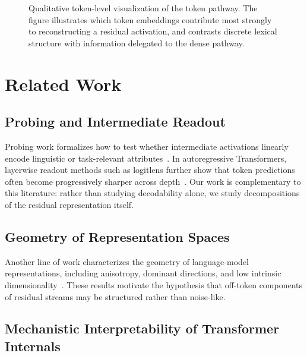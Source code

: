 \documentclass{article}
\begin{document}
\begin{figure}[t]
  \centering
  \caption{
    Qualitative token-level visualization of the token pathway.
    The figure illustrates which token embeddings contribute most strongly to reconstructing a residual activation, and contrasts discrete lexical structure with information delegated to the dense pathway.
  }
  \label{fig:token_vis}
\end{figure}

\section{Related Work}

\subsection{Probing and Intermediate Readout}

Probing work formalizes how to test whether intermediate activations linearly encode linguistic or task-relevant attributes~\cite{tenneyBERTRediscoversClassical2019,hewittDesigningInterpretingProbes2019}. In autoregressive Transformers, layerwise readout methods such as \gls{logitlens} further show that token predictions often become progressively sharper across depth~\cite{belroseElicitingLatentPredictions2023}. Our work is complementary to this literature: rather than studying decodability alone, we study decompositions of the residual representation itself.

\subsection{Geometry of Representation Spaces}

Another line of work characterizes the geometry of language-model representations, including anisotropy, dominant directions, and low intrinsic dimensionality~\cite{ethayarajhHowContextualAre2019,muAllbuttheTopSimpleEffective2018,aghajanyanIntrinsicDimensionalityExplains2021}. These results motivate the hypothesis that off-token components of residual streams may be structured rather than noise-like.

\subsection{Mechanistic Interpretability of Transformer Internals}
\end{document}
